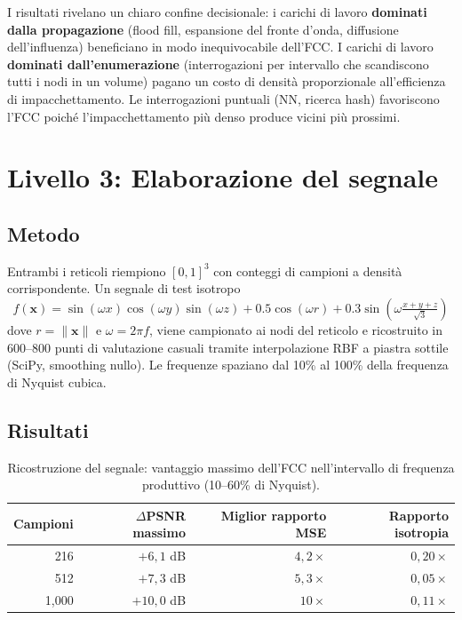 \documentclass[11pt]{article}
\begin{document}
I risultati rivelano un chiaro confine decisionale: i carichi di lavoro
\textbf{dominati dalla propagazione} (flood fill, espansione del fronte
d'onda, diffusione dell'influenza) beneficiano in modo inequivocabile
dell'FCC. I carichi di lavoro \textbf{dominati dall'enumerazione}
(interrogazioni per intervallo che scandiscono tutti i nodi in un volume)
pagano un costo di densit\`a proporzionale all'efficienza di
impacchettamento. Le interrogazioni puntuali (NN, ricerca hash) favoriscono
l'FCC poich\'e l'impacchettamento pi\`u denso produce vicini pi\`u
prossimi.

\section{Livello 3: Elaborazione del segnale}
\label{sec:signal}

\subsection{Metodo}

Entrambi i reticoli riempiono $[0,1]^3$ con conteggi di campioni a
densit\`a corrispondente. Un segnale di test isotropo
\begin{equation}
  f(\mathbf{x}) = \sin(\omega x)\cos(\omega y)\sin(\omega z)
    + 0.5\cos(\omega r) + 0.3\sin\!\left(\omega\tfrac{x+y+z}{\sqrt{3}}\right)
\end{equation}
dove $r = \|\mathbf{x}\|$ e $\omega = 2\pi f$, viene campionato
ai nodi del reticolo e ricostruito in 600--800 punti di valutazione
casuali tramite interpolazione RBF a piastra sottile (SciPy, smoothing
nullo). Le frequenze spaziano dal 10\% al 100\% della frequenza di
Nyquist cubica.

\subsection{Risultati}

\begin{table}[H]
\centering
\caption{Ricostruzione del segnale: vantaggio massimo dell'FCC
nell'intervallo di frequenza produttivo (10--60\% di Nyquist).}
\label{tab:signal}
\begin{tabular}{rrrr}
\toprule
Campioni & $\Delta$PSNR massimo & Miglior rapporto MSE & Rapporto isotropia \\
\midrule
216   & $+6{,}1$ dB  & $4{,}2\times$ & $0{,}20\times$ \\
512   & $+7{,}3$ dB  & $5{,}3\times$ & $0{,}05\times$ \\
1{,}000 & $+10{,}0$ dB & $10\times$  & $0{,}11\times$ \\
\bottomrule
\end{tabular}
\end{table}
\end{document}
